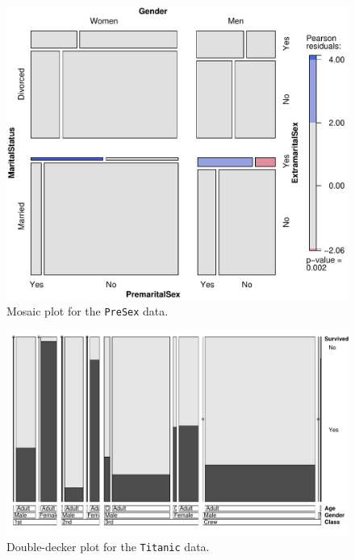 \documentclass{Z}
\newcommand{\data}[1]{\texttt{#1}}
\begin{document}
\begin{figure}[p]
\begin{center}
\includegraphics{strucplot-PreSex}
\caption{Mosaic plot for the \data{PreSex} data.}
\label{fig:presex}
\end{center}
\end{figure}

\begin{figure}[p]
\begin{center}
\includegraphics{strucplot-Titanic}
\caption{Double-decker plot for the \data{Titanic} data.}
\label{fig:titanic}
\end{center}
\end{figure}
\end{document}
